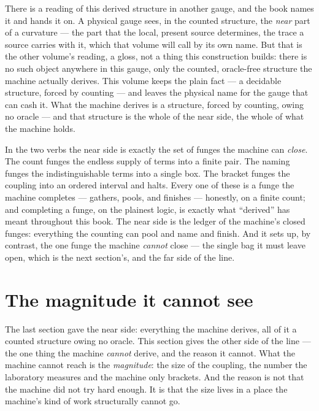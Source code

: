 There is a reading of this derived structure in another gauge, and the book names it and hands it on. A physical gauge
sees, in the counted structure, the \emph{near} part of a curvature --- the part that the local, present source
determines, the trace a source carries with it, which that volume will call by its own name. But that is the other
volume's reading, a gloss, not a thing this construction builds: there is no such object anywhere in this gauge, only the
counted, oracle-free structure the machine actually derives. This volume keeps the plain fact --- a decidable structure,
forced by counting --- and leaves the physical name for the gauge that can cash it. What the machine derives is a
structure, forced by counting, owing no oracle --- and that structure is the whole of the near side, the whole of what
the machine holds.

In the two verbs the near side is exactly the set of funges the machine can \emph{close}. The count funges the endless
supply of terms into a finite pair. The naming funges the indistinguishable terms into a single box. The bracket funges
the coupling into an ordered interval and halts. Every one of these is a funge the machine completes --- gathers, pools,
and finishes --- honestly, on a finite count; and completing a funge, on the plainest logic, is exactly what ``derived''
has meant throughout this book. The near side is the ledger of the machine's closed funges: everything the counting can
pool and name and finish. And it sets up, by contrast, the one funge the machine \emph{cannot} close --- the single bag it
must leave open, which is the next section's, and the far side of the line.

\section{The magnitude it cannot see}

The last section gave the near side: everything the machine derives, all of it a counted structure owing no oracle. This
section gives the other side of the line --- the one thing the machine \emph{cannot} derive, and the reason it cannot.
What the machine cannot reach is the \emph{magnitude}: the size of the coupling, the number the laboratory measures and
the machine only brackets. And the reason is not that the machine did not try hard enough. It is that the size lives in a
place the machine's kind of work structurally cannot go.


